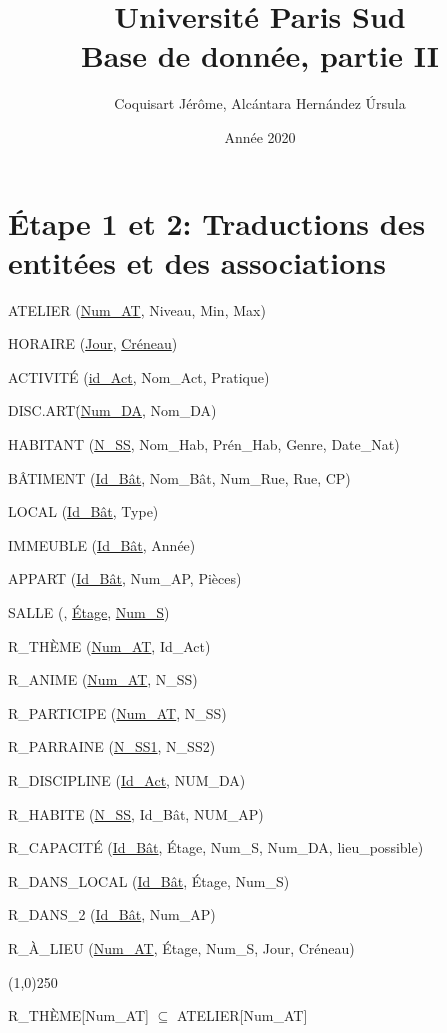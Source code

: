 \documentclass[a4paper,10.5pt]{report}
\title{\textbf{\Huge  Université Paris Sud}\\ Base de donnée, partie II}
\author{Coquisart Jérôme, Alcántara Hernández Úrsula}
\date{Année 2020}
\begin{document}
    \maketitle
    \newpage
    \newpage

    \section*{Étape 1 et 2: Traductions des entitées et des associations}

	ATELIER (\underline{Num\_AT}, Niveau, Min, Max)

	HORAIRE (\underline{Jour}, \underline{Créneau})

	ACTIVITÉ (\underline{id\_Act}, Nom\_Act, Pratique) 

	DISC.ART\. (\underline{Num\_DA}, Nom\_DA)

	HABITANT (\underline{N\_SS}, Nom\_Hab, Prén\_Hab, Genre, Date\_Nat)

	BÂTIMENT (\underline{Id\_Bât}, Nom\_Bât, Num\_Rue, Rue, CP)

	LOCAL (\underline{Id\_Bât}, Type)

	IMMEUBLE (\underline{Id\_Bât}, Année)

	APPART (\underline{Id\_Bât}, Num\_AP, Pièces)

	SALLE (, \underline{Étage}, \underline{Num\_S})

	R\_THÈME (\underline{Num\_AT}, Id\_Act)

	R\_ANIME (\underline{Num\_AT}, N\_SS)

	R\_PARTICIPE (\underline{Num\_AT}, N\_SS)

	R\_PARRAINE (\underline{N\_SS1}, N\_SS2)

	R\_DISCIPLINE (\underline{Id\_Act}, NUM\_DA)

	R\_HABITE (\underline{N\_SS}, Id\_Bât, NUM\_AP)

	R\_CAPACITÉ (\underline{Id\_Bât}, Étage, Num\_S, Num\_DA, lieu\_possible)

	R\_DANS\_LOCAL (\underline{Id\_Bât}, Étage, Num\_S)

	R\_DANS\_2 (\underline{Id\_Bât}, Num\_AP)

	R\_À\_LIEU (\underline{Num\_AT}, Étage, Num\_S, Jour, Créneau)

	\begin{center}
	\line(1,0){250}
	\end{center}

	R\_THÈME[Num\_AT] $\subseteq$ ATELIER[Num\_AT]
\end{document}
